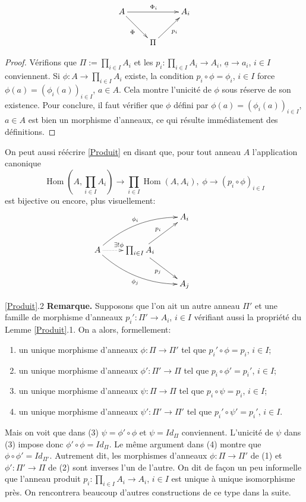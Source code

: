 \documentclass[a4paper, oneside, 12pt]{book}
\theoremstyle{theoremeStyle} %
\theoremstyle{definition} %
\DeclareMathOperator{\SHom}{Hom}
\begin{document}
	$$ \xymatrix{ A \ar[rr]^{\Phi_i} \ar[rd]_\Phi && A_i \\ & \Pi  \ar[ru]_{p_i}} $$

\begin{proof} Vérifions que $\Pi:= \prod_{i\in I}A_i$ et les $p_i:\prod_{i\in I}A_i\rightarrow A_i$, $\underline{a}\rightarrow a_i$, $i\in I$ conviennent. Si $\phi:A\rightarrow \prod_{i\in I}A_i$ existe, la condition $p_i\circ \phi =\phi_i$, $i\in I$ force
$\phi(a)=(\phi_i(a))_{i\in I}$, $a\in A$. Cela montre l'unicité de $\phi$  sous réserve de son existence. Pour conclure, il faut vérifier que $\phi$ défini par  $\phi(a)=(\phi_i(a))_{i\in I}$, $a\in A$ est bien un morphisme d'anneaux, ce qui résulte immédiatement des définitions.
\end{proof}

 On peut aussi réécrire \ref{Produit} en disant que, pour tout anneau $A$  l'application  canonique
$$\SHom(A,\prod_{i\in I}A_{i})\rightarrow \prod_{i\in I}\SHom (A,A_{i}), \; \phi\rightarrow (p_i\circ \phi)_{i\in I}$$
 est bijective ou encore, plus visuellement:
$$\xymatrix{&&A_i \\
A\ar@{.>}[r]^{\exists ! \phi}\ar@/^1pc/[urr]^{\phi_i}\ar@/_1pc/[drr]_{\phi_j}&\prod_{i\in I}A_i\ar[ur]^{p_i}\ar[dr]_{p_j}\\
&&A_j& }$$

\ref{Produit}.2 \textbf{Remarque.} Supposons que l'on ait un autre anneau  $\Pi'$ et une famille de morphisme d'anneaux $p_i':\Pi'\rightarrow A_i$, $i\in I$ vérifiant aussi la propriété du Lemme \ref{Produit}.1. On a alors, formellement:
\begin{enumerate}[leftmargin=* ,parsep=0cm,itemsep=0cm,topsep=0cm]
\item un unique morphisme d'anneaux $\phi:\Pi\rightarrow \Pi'$ tel que $p_i'\circ \phi=p_i$, $i\in I$;
\item un unique morphisme d'anneaux $\phi':\Pi'\rightarrow \Pi$ tel que $p_i\circ \phi'=p_i'$, $i\in I$;
\item un unique morphisme d'anneaux $\psi:\Pi\rightarrow \Pi$ tel que $p_i\circ \psi=p_i$, $i\in I$;
\item un unique morphisme d'anneaux $\psi':\Pi'\rightarrow \Pi'$ tel que $p_i'\circ \psi'=p_i'$, $i\in I$.
\end{enumerate}
 Mais on voit que dans (3) $\psi=\phi'\circ \phi$ et $\psi=Id_\Pi$ conviennent. L'unicité de $\psi$ dans (3) impose donc $\phi'\circ \phi=Id_\Pi$. Le même argument dans (4) montre que $\phi\circ \phi'=Id_{\Pi'}$. Autrement dit, les morphismes d'anneaux $\phi:\Pi\rightarrow \Pi'$ de (1) et $\phi':\Pi'\rightarrow \Pi$ de (2) sont inverses l'un de l'autre. On dit de fa\c{c}on un peu informelle que l'anneau produit  $p_i:\prod_{i\in I}A_i\rightarrow A_i$, $i\in I$ est unique à unique isomorphisme près. On rencontrera beaucoup d'autres constructions de ce type dans la suite.\\
\end{document}
